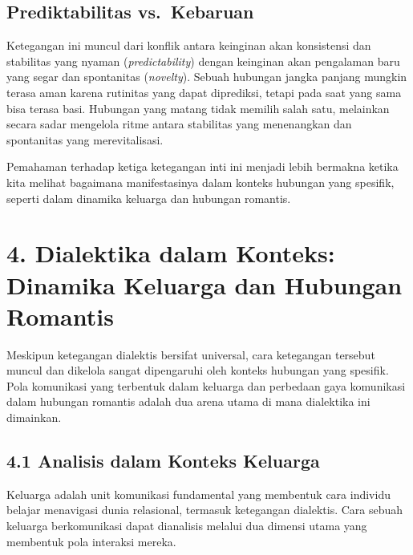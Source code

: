 \documentclass[
  letterpaper,
  DIV=11,
  numbers=noendperiod]{scrreprt}
\begin{document}
\subsection{\texorpdfstring{\textbf{Prediktabilitas
vs.~Kebaruan}}{Prediktabilitas vs.~Kebaruan}}\label{prediktabilitas-vs.-kebaruan}

Ketegangan ini muncul dari konflik antara keinginan akan konsistensi dan
stabilitas yang nyaman (\emph{predictability}) dengan keinginan akan
pengalaman baru yang segar dan spontanitas (\emph{novelty}). Sebuah
hubungan jangka panjang mungkin terasa aman karena rutinitas yang dapat
diprediksi, tetapi pada saat yang sama bisa terasa basi. Hubungan yang
matang tidak memilih salah satu, melainkan secara sadar mengelola ritme
antara stabilitas yang menenangkan dan spontanitas yang merevitalisasi.

Pemahaman terhadap ketiga ketegangan inti ini menjadi lebih bermakna
ketika kita melihat bagaimana manifestasinya dalam konteks hubungan yang
spesifik, seperti dalam dinamika keluarga dan hubungan romantis.

\section{\texorpdfstring{\textbf{4. Dialektika dalam Konteks: Dinamika
Keluarga dan Hubungan
Romantis}}{4. Dialektika dalam Konteks: Dinamika Keluarga dan Hubungan Romantis}}\label{dialektika-dalam-konteks-dinamika-keluarga-dan-hubungan-romantis}

Meskipun ketegangan dialektis bersifat universal, cara ketegangan
tersebut muncul dan dikelola sangat dipengaruhi oleh konteks hubungan
yang spesifik. Pola komunikasi yang terbentuk dalam keluarga dan
perbedaan gaya komunikasi dalam hubungan romantis adalah dua arena utama
di mana dialektika ini dimainkan.

\subsection{\texorpdfstring{\textbf{4.1 Analisis dalam Konteks
Keluarga}}{4.1 Analisis dalam Konteks Keluarga}}\label{analisis-dalam-konteks-keluarga}

Keluarga adalah unit komunikasi fundamental yang membentuk cara individu
belajar menavigasi dunia relasional, termasuk ketegangan dialektis. Cara
sebuah keluarga berkomunikasi dapat dianalisis melalui dua dimensi utama
yang membentuk pola interaksi mereka.
\end{document}
